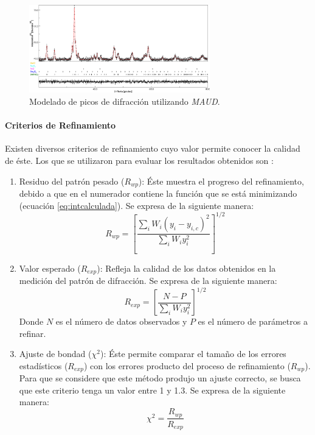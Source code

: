 \documentclass[../main.tex]{subfiles}
\begin{document}
\begin{figure}[H]
    \centering
    \includegraphics[width=0.7\textwidth]{fig/Rietveld.png}
    \caption{Modelado de picos de difracción utilizando \textit{MAUD}.}
    \label{fig:picosrietveld}
\end{figure}
\paragraph{Criterios de Refinamiento} \label{sec:refinamiento}
Existen diversos criterios de refinamiento cuyo valor permite conocer la calidad de éste. Los que se utilizaron para evaluar los resultados obtenidos son \cite{Rietveld}:
\begin{enumerate}[label=\textbf{\alph*)}]
    \item Residuo del patrón pesado ($R_{wp}$): Éste muestra el progreso del refinamiento, debido a que en el numerador contiene la función que se está minimizando (ecuación \ref{eq:intcalculada}). Se expresa de la siguiente manera:
    \begin{equation}
        R_{wp}=\left[\dfrac{\sum_i W_i\left(y_i-y_{i,c}\right)^2}{\sum_i W_i y_i^2}\right]^{1/2}
        \label{eq:patronpesado}
    \end{equation}
    \item Valor esperado ($R_{exp}$): Refleja la calidad de los datos obtenidos en la medición del patrón de difracción. Se expresa de la siguiente manera:
    \begin{equation}
        R_{exp}=\left[\dfrac{N-P}{\sum_i W_i y_i^2}\right]^{1/2}
        \label{eq:valoresperado}
    \end{equation}
    Donde $N$ es el número de datos observados y $P$ es el número de parámetros a refinar.
    \item Ajuste de bondad ($\chi^2$): Éste permite comparar el tamaño de los errores estadísticos ($R_{exp}$) con los errores producto del proceso de refinamiento ($R_{wp}$). Para que se considere que este método produjo un ajuste correcto, se busca que este criterio tenga un valor entre 1 y 1.3. Se expresa de la siguiente manera:
    \begin{equation}
        \chi^2=\dfrac{R_{wp}}{R_{exp}}
        \label{eq:ajustebondad}
    \end{equation}
\end{enumerate}
\end{document}
